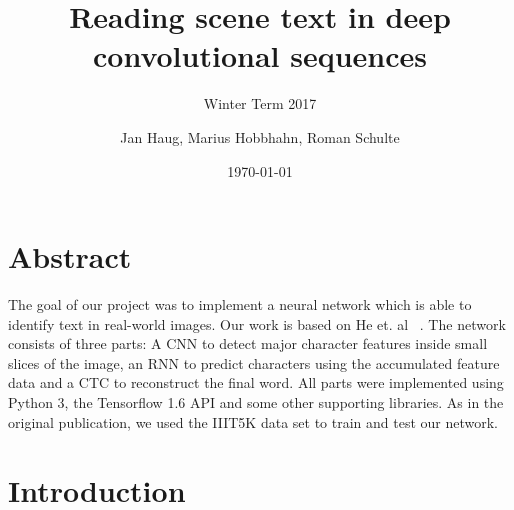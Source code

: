 \documentclass{utue} %
\title{Reading scene text in deep convolutional sequences}
\author{Jan Haug, Marius Hobbhahn, Roman Schulte}
\date{\today}
\subtitle{Winter Term 2017}
\begin{document}
	



\maketitle

\section*{Abstract}
The goal of our project was to implement a neural network which is able to identify text in real-world images.
Our work is based on He et. al ~\cite{2015arXiv150604395H}. The network consists of three parts: A CNN to detect major character features inside small slices of the image, an RNN to predict characters using the accumulated feature data and a CTC to reconstruct the final word. All parts were implemented using Python 3, the Tensorflow 1.6 API and some other supporting libraries. As in the original publication, we used the IIIT5K data set to train and test our network.

\section{Introduction}
\end{document}
